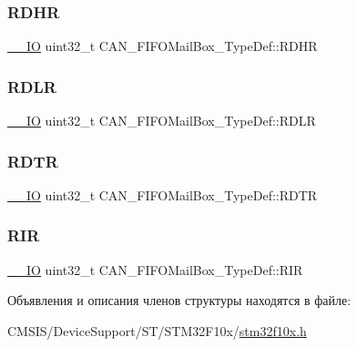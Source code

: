 \subsubsection{\texorpdfstring{RDHR}{RDHR}}
{\footnotesize\ttfamily \mbox{\hyperlink{group___c_m_s_i_s___c_m3__core__definitions_gaec43007d9998a0a0e01faede4133d6be}{\+\_\+\+\_\+\+IO}} uint32\+\_\+t C\+A\+N\+\_\+\+F\+I\+F\+O\+Mail\+Box\+\_\+\+Type\+Def\+::\+R\+D\+HR}

\mbox{\label{struct_c_a_n___f_i_f_o_mail_box___type_def_ac7d62861de29d0b4fcf11fabbdbd76e7}} 
\subsubsection{\texorpdfstring{RDLR}{RDLR}}
{\footnotesize\ttfamily \mbox{\hyperlink{group___c_m_s_i_s___c_m3__core__definitions_gaec43007d9998a0a0e01faede4133d6be}{\+\_\+\+\_\+\+IO}} uint32\+\_\+t C\+A\+N\+\_\+\+F\+I\+F\+O\+Mail\+Box\+\_\+\+Type\+Def\+::\+R\+D\+LR}

\mbox{\label{struct_c_a_n___f_i_f_o_mail_box___type_def_a49d74ca8b402c2b9596bfcbe4cd051a9}} 
\subsubsection{\texorpdfstring{RDTR}{RDTR}}
{\footnotesize\ttfamily \mbox{\hyperlink{group___c_m_s_i_s___c_m3__core__definitions_gaec43007d9998a0a0e01faede4133d6be}{\+\_\+\+\_\+\+IO}} uint32\+\_\+t C\+A\+N\+\_\+\+F\+I\+F\+O\+Mail\+Box\+\_\+\+Type\+Def\+::\+R\+D\+TR}

\mbox{\label{struct_c_a_n___f_i_f_o_mail_box___type_def_a034504d43f7b16b320745a25b3a8f12d}} 
\subsubsection{\texorpdfstring{RIR}{RIR}}
{\footnotesize\ttfamily \mbox{\hyperlink{group___c_m_s_i_s___c_m3__core__definitions_gaec43007d9998a0a0e01faede4133d6be}{\+\_\+\+\_\+\+IO}} uint32\+\_\+t C\+A\+N\+\_\+\+F\+I\+F\+O\+Mail\+Box\+\_\+\+Type\+Def\+::\+R\+IR}



Объявления и описания членов структуры находятся в файле\+:\begin{DoxyCompactItemize}
\item 
C\+M\+S\+I\+S/\+Device\+Support/\+S\+T/\+S\+T\+M32\+F10x/\mbox{\hyperlink{stm32f10x_8h}{stm32f10x.\+h}}\end{DoxyCompactItemize}
